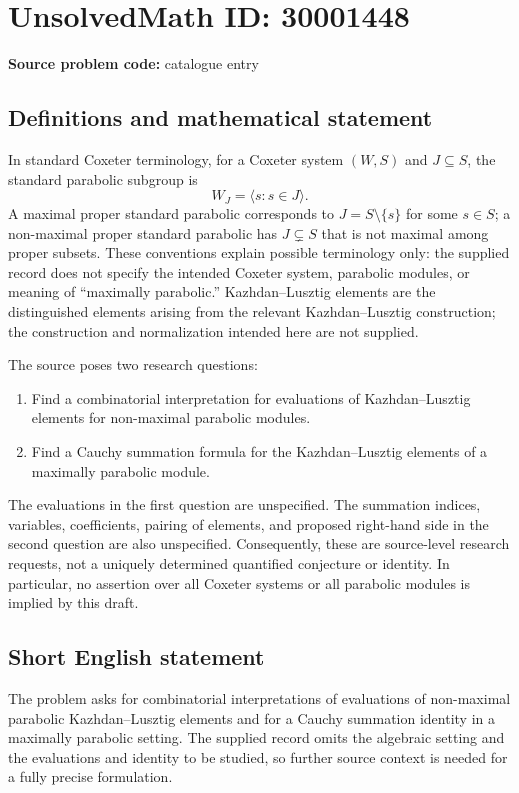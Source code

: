 \documentclass[11pt]{article}
\begin{document}
\section*{UnsolvedMath ID: 30001448}
\textbf{Source problem code:} catalogue entry
\subsection{Definitions and mathematical statement}
In standard Coxeter terminology, for a Coxeter system \((W,S)\) and \(J\subseteq S\), the standard parabolic subgroup is
\[
W_J=\langle s:s\in J\rangle.
\]
A maximal proper standard parabolic corresponds to \(J=S\setminus\{s\}\) for some \(s\in S\); a non-maximal proper standard parabolic has \(J\subsetneq S\) that is not maximal among proper subsets. These conventions explain possible terminology only: the supplied record does not specify the intended Coxeter system, parabolic modules, or meaning of ``maximally parabolic.'' Kazhdan--Lusztig elements are the distinguished elements arising from the relevant Kazhdan--Lusztig construction; the construction and normalization intended here are not supplied.

The source poses two research questions:
\begin{enumerate}
\item Find a combinatorial interpretation for evaluations of Kazhdan--Lusztig elements for non-maximal parabolic modules.
\item Find a Cauchy summation formula for the Kazhdan--Lusztig elements of a maximally parabolic module.
\end{enumerate}
The evaluations in the first question are unspecified. The summation indices, variables, coefficients, pairing of elements, and proposed right-hand side in the second question are also unspecified. Consequently, these are source-level research requests, not a uniquely determined quantified conjecture or identity. In particular, no assertion over all Coxeter systems or all parabolic modules is implied by this draft.
\subsection{Short English statement}
The problem asks for combinatorial interpretations of evaluations of non-maximal parabolic Kazhdan--Lusztig elements and for a Cauchy summation identity in a maximally parabolic setting. The supplied record omits the algebraic setting and the evaluations and identity to be studied, so further source context is needed for a fully precise formulation.
\end{document}
